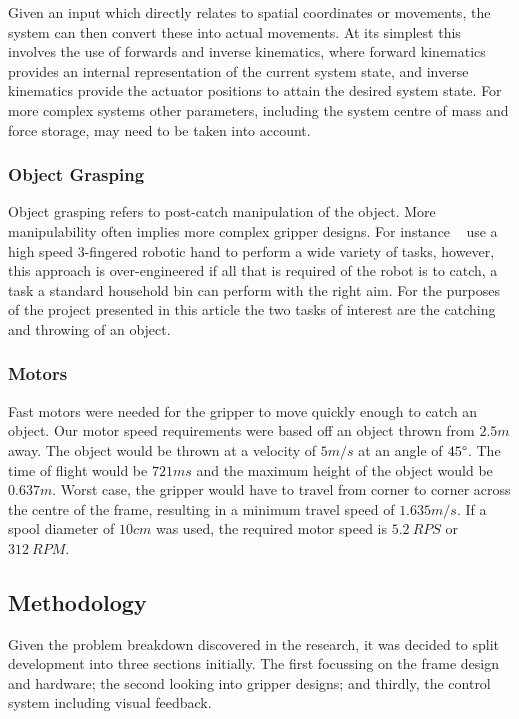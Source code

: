 \documentclass[conference]{IEEEtran}
\begin{document}
	Given an input which directly relates to spatial coordinates or movements, the system can then convert these into actual movements. At its simplest this involves the use of forwards and inverse kinematics, where forward kinematics provides an internal representation of the current system state, and inverse kinematics provide the actuator positions to attain the desired system state. For more complex systems other parameters, including the system centre of mass and force storage, may need to be taken into account. 
	
	\subsubsection{Object Grasping}
	Object grasping refers to post-catch manipulation of the object. More manipulability often implies more complex gripper designs. For instance ~\cite{1249273} use a high speed 3-fingered robotic hand to perform a wide variety of tasks, however, this approach is over-engineered if all that is required of the robot is to catch, a task a standard household bin can perform with the right aim.
	For the purposes of the project presented in this article the two tasks of interest are the catching and throwing of an object.
	
	\subsubsection{Motors}\label{motorSpeedRequired}
	Fast motors were needed for the gripper to move quickly enough to catch an object. Our motor speed requirements were based off an object thrown from $2.5m$ away. The object would be thrown at a velocity of $5m/s$ at an angle of $45\degree$. The time of flight would be $721ms$ and the maximum height of the object would be $0.637m$. Worst case, the gripper would have to travel from corner to corner across the centre of the frame, resulting in a minimum travel speed of $1.635m/s$. If a spool diameter of $10cm$ was used, the required motor speed is $5.2\ RPS$ or $312\ RPM$.
	
		\subsection{Methodology}
		Given the problem breakdown discovered in the research, it was decided to split development into three sections initially. The first focussing on the frame design and hardware; the second looking into gripper designs; and thirdly, the control system including visual feedback.
		
\end{document}
